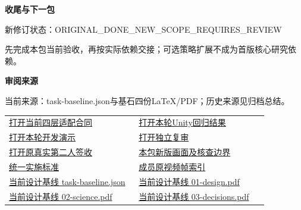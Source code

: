 \documentclass[11pt,a4paper]{article}
\newcommand{\reviewsubsection}[1]{\par\Needspace{4\baselineskip}\vspace{4pt}\begin{center}{\titlelatin\titlecjk\bfseries\fontsize{12}{18}\selectfont #1}\end{center}}
\begin{document}
\reviewsubsection{3.3 收尾与下一包}
新修订状态：ORIGINAL\_\allowbreak{}DONE\_\allowbreak{}NEW\_\allowbreak{}SCOPE\_\allowbreak{}REQUIRES\_\allowbreak{}REVIEW


先完成本包当前验收，再按实际依赖交接；可选策略扩展不成为首版核心研究依赖。


\begin{minipage}{\linewidth}
\reviewsubsection{3.4 审阅来源}
当前来源：task-\allowbreak{}baseline.json与基石四份LaTeX/\allowbreak{}PDF；历史来源见归档总结。


\begingroup\small\setlength{\tabcolsep}{4pt}\begin{tabular}{@{}p{0.48\linewidth}p{0.48\linewidth}@{}}
\href{file:///D:/Agent/srp/agent/tasks/U-02/outputs/current-adapter-contract.md}{打开当前四层适配合同} & \href{file:///D:/Agent/srp/agent/tasks/U-02/evidence/runtime/results.json}{打开本轮Unity回归结果}\\[4pt]
\href{file:///D:/Agent/srp/agent/tasks/U-02/evidence/runtime/demo/degradation-demo.mp4}{打开本轮开发演示} & \href{file:///D:/Agent/srp/agent/tasks/U-02/evidence/independent-review.md}{打开独立复审}\\[4pt]
\href{file:///D:/Agent/srp/agent/governance/planning/2026-08-05_SRP_IJHCI_\%E5\%85\%A8\%E9\%A1\%B9\%E7\%9B\%AE1-12\%E6\%AD\%A5\%E8\%A7\%84\%E5\%88\%92\%E8\%AE\%BE\%E8\%AE\%A1\%E5\%8C\%85_v1.0/24_\%E5\%9B\%A2\%E9\%98\%9F\%E4\%BB\%BB\%E5\%8A\%A1\%E4\%B8\%8E\%E9\%A1\%B9\%E7\%9B\%AE\%E6\%B2\%BB\%E7\%90\%86/task_member_outputs/U-02/\%E7\%AC\%AC\%E4\%BA\%8C\%E4\%BA\%BA\%E5\%AE\%A1\%E6\%A0\%B8\%E6\%8A\%A5\%E5\%91\%8A_\%E5\%B7\%B2\%E7\%AD\%BE\%E7\%BD\%B2.md}{打开原真实第二人签收} & \href{file:///D:/Agent/srp/agent/tasks/U-02/outputs/current-implementation-evidence.md}{本包新版画面及核查边界}\\[4pt]
\href{file:///D:/Agent/srp/agent/design/weather/2026-10-08_Storm\%E4\%B8\%8E\%E7\%BA\%AF\%E7\%B2\%92\%E5\%AD\%90\%E5\%8F\%8C\%E7\%8E\%AF\%E5\%AE\%9E\%E6\%96\%BD\%E6\%A0\%87\%E5\%87\%86.md}{统一实施标准} & \href{file:///D:/Agent/srp/human/assets/previews/2026-10-08/member-storm-particle-rings/frame-index.json}{成员原视频帧索引}\\[4pt]
\href{file:///D:/Agent/srp/agent/design/design-foundation-20261008/task-baseline.json}{当前设计基线 task-\allowbreak{}baseline.json} & \href{file:///D:/Agent/srp/agent/design/design-foundation-20261008/01-design.pdf}{当前设计基线 01-\allowbreak{}design.pdf}\\[4pt]
\href{file:///D:/Agent/srp/agent/design/design-foundation-20261008/02-science.pdf}{当前设计基线 02-\allowbreak{}science.pdf} & \href{file:///D:/Agent/srp/agent/design/design-foundation-20261008/03-decisions.pdf}{当前设计基线 03-\allowbreak{}decisions.pdf}\\[4pt]

\end{tabular}
\end{minipage}
\end{document}
